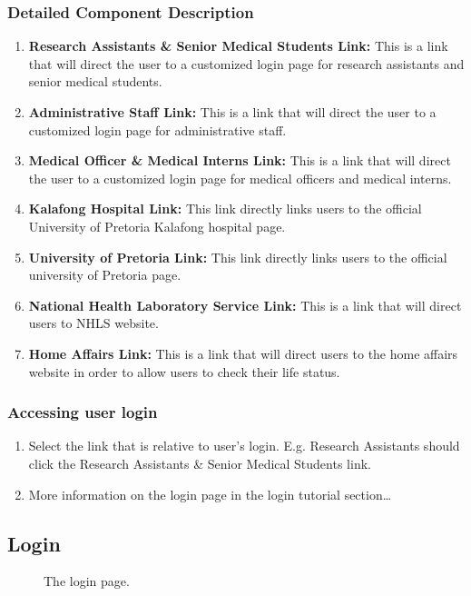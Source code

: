 \documentclass[14pt, a4paper]{article}
\begin{document}
\subsubsection{Detailed Component Description}
\begin{enumerate}
\item \textbf{Research Assistants \& Senior Medical Students Link:} This is a link that will direct the user to a customized login page for research assistants and senior medical students.
\item \textbf{Administrative Staff Link:} This is a link that will direct the user to a customized login page for administrative staff.
\item \textbf{Medical Officer \& Medical Interns Link:} This is a link that will direct the user to a customized login page for medical officers and medical interns.
\item \textbf{Kalafong Hospital Link:} This link directly links users to the official University of Pretoria Kalafong hospital page.
\item \textbf{University of Pretoria Link: } This link directly links users to the official university of Pretoria page.
\item \textbf{National Health Laboratory Service Link:} This is a link that will direct users to NHLS website.
\item \textbf{Home Affairs Link:} This is a link that will direct users to the home affairs website in order to allow users to check their life status.
\end{enumerate}
\subsubsection{Accessing user login}
\begin{enumerate}
\item Select the link that is relative to user's login. E.g. Research Assistants should click the Research Assistants \& Senior Medical Students link.
\item More information on the login page in the login tutorial section\ldots
\end{enumerate}
\subsection{Login}
\begin{figure}[H]
\caption{The login page.}
\label{fig:login1}
\end{figure}
\end{document}
